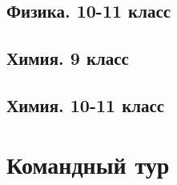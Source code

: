 \documentclass[a4paper,12pt,oneside]{book}
\begin{document}
\section{Физика. 10-11 класс}


\section{Химия. 9 класс}


\section{Химия. 10-11 класс}


\chapter{Командный тур}



\end{document}
